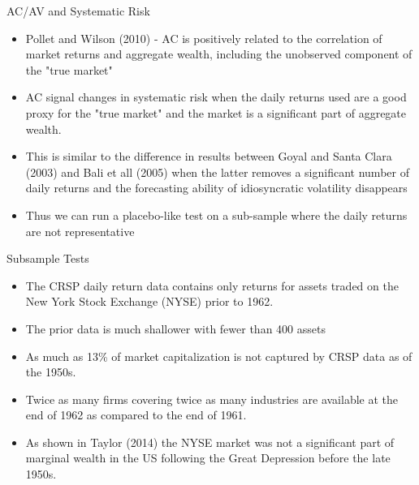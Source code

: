 \documentclass{beamer}
\begin{document}
%			





\begin{frame}{AC/AV and Systematic Risk}
	\begin{itemize}[<+->]
		\item Pollet and Wilson (2010) - AC is positively related to the correlation of market returns and aggregate wealth, including the unobserved component of the "true market"
		\item AC signal changes in systematic risk when the daily returns used are a good proxy for the "true market" and the market is a significant part of aggregate wealth.
		\item This is similar to the difference in results between Goyal and Santa Clara (2003) and Bali et all (2005) when the latter removes a significant number of daily returns and the forecasting ability of idiosyncratic volatility disappears
		\item Thus we can run a placebo-like test on a sub-sample where the daily returns are not representative
	\end{itemize}
\end{frame}

\begin{frame}{Subsample Tests}
	\begin{itemize}[<+->]
		\item The CRSP daily return data contains only returns for assets traded on the New York Stock Exchange (NYSE) prior to 1962. 
		\item The prior data is much shallower with fewer than 400 assets 
		\item As much as 13\% of market capitalization is not captured by CRSP data as of the 1950s. 
		\item Twice as many firms covering twice as many industries are available at the end of 1962 as compared to the end of 1961. 
		\item As shown in Taylor (2014) the NYSE market was not a significant part of marginal wealth in the US following the Great Depression before the late 1950s. 
	\end{itemize}
\end{frame}
\end{document}
